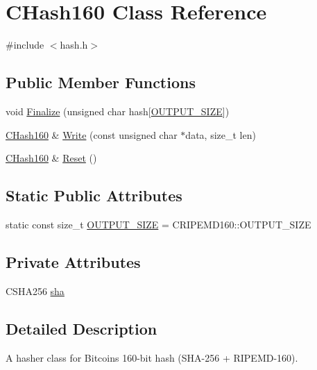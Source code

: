 \hypertarget{class_c_hash160}{}\section{C\+Hash160 Class Reference}
\label{class_c_hash160}


{\ttfamily \#include $<$hash.\+h$>$}

\subsection*{Public Member Functions}
\begin{DoxyCompactItemize}
\item 
void \mbox{\hyperlink{class_c_hash160_a9bb08e1772002ae1a5d85017ba7952ee}{Finalize}} (unsigned char hash\mbox{[}\mbox{\hyperlink{class_c_hash160_a1a5618e17d91ea96e86d779f575211eb}{O\+U\+T\+P\+U\+T\+\_\+\+S\+I\+ZE}}\mbox{]})
\item 
\mbox{\hyperlink{class_c_hash160}{C\+Hash160}} \& \mbox{\hyperlink{class_c_hash160_af56cdd9443013eb68b246aa8450217f2}{Write}} (const unsigned char $\ast$data, size\+\_\+t len)
\item 
\mbox{\hyperlink{class_c_hash160}{C\+Hash160}} \& \mbox{\hyperlink{class_c_hash160_a971a8d59073455b1ef0ac0f65e964772}{Reset}} ()
\end{DoxyCompactItemize}
\subsection*{Static Public Attributes}
\begin{DoxyCompactItemize}
\item 
static const size\+\_\+t \mbox{\hyperlink{class_c_hash160_a1a5618e17d91ea96e86d779f575211eb}{O\+U\+T\+P\+U\+T\+\_\+\+S\+I\+ZE}} = C\+R\+I\+P\+E\+M\+D160\+::\+O\+U\+T\+P\+U\+T\+\_\+\+S\+I\+ZE
\end{DoxyCompactItemize}
\subsection*{Private Attributes}
\begin{DoxyCompactItemize}
\item 
C\+S\+H\+A256 \mbox{\hyperlink{class_c_hash160_a5b104e31076a06ece47c1134bbed0a81}{sha}}
\end{DoxyCompactItemize}


\subsection{Detailed Description}
A hasher class for Bitcoin\textquotesingle{}s 160-\/bit hash (S\+H\+A-\/256 + R\+I\+P\+E\+M\+D-\/160). 

